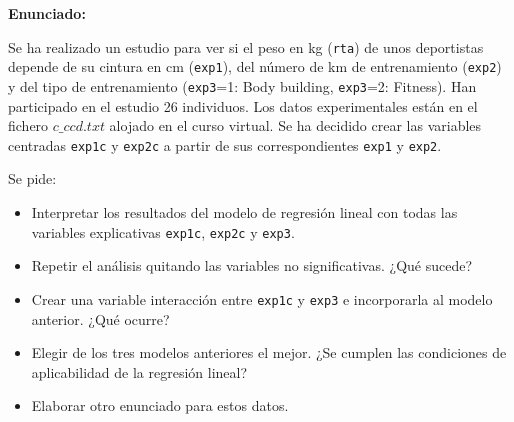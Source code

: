 \documentclass[a4paper]{article}
\begin{document}
\textbf{Enunciado:}\par
Se ha realizado un estudio para ver si el peso en kg (\verb|rta|) de unos deportistas depende de su
cintura en cm (\verb|exp1|), del número de km de entrenamiento (\verb|exp2|) y del tipo de entrenamiento (\verb|exp3|=1: Body building, \verb|exp3|=2: Fitness). Han participado en el estudio 26 individuos. Los datos experimentales están en el fichero $c\_ccd.txt$ alojado en el curso virtual. Se ha decidido crear
las variables centradas \verb|exp1c| y \verb|exp2c| a partir de sus correspondientes \verb|exp1| y \verb|exp2|.\par
Se pide:
\begin{itemize}
    \item Interpretar los resultados del modelo de regresión lineal con todas las variables explicativas \verb|exp1c|, \verb|exp2c| y \verb|exp3|.
    \item Repetir el análisis quitando las variables no significativas. ¿Qué sucede?
    \item Crear una variable interacción entre \verb|exp1c| y \verb|exp3| e incorporarla al modelo anterior. ¿Qué ocurre?
    \item Elegir de los tres modelos anteriores el mejor. ¿Se cumplen las condiciones de aplicabilidad de la regresión lineal?
    \item Elaborar otro enunciado para estos datos.
\end{itemize}
\end{document}
